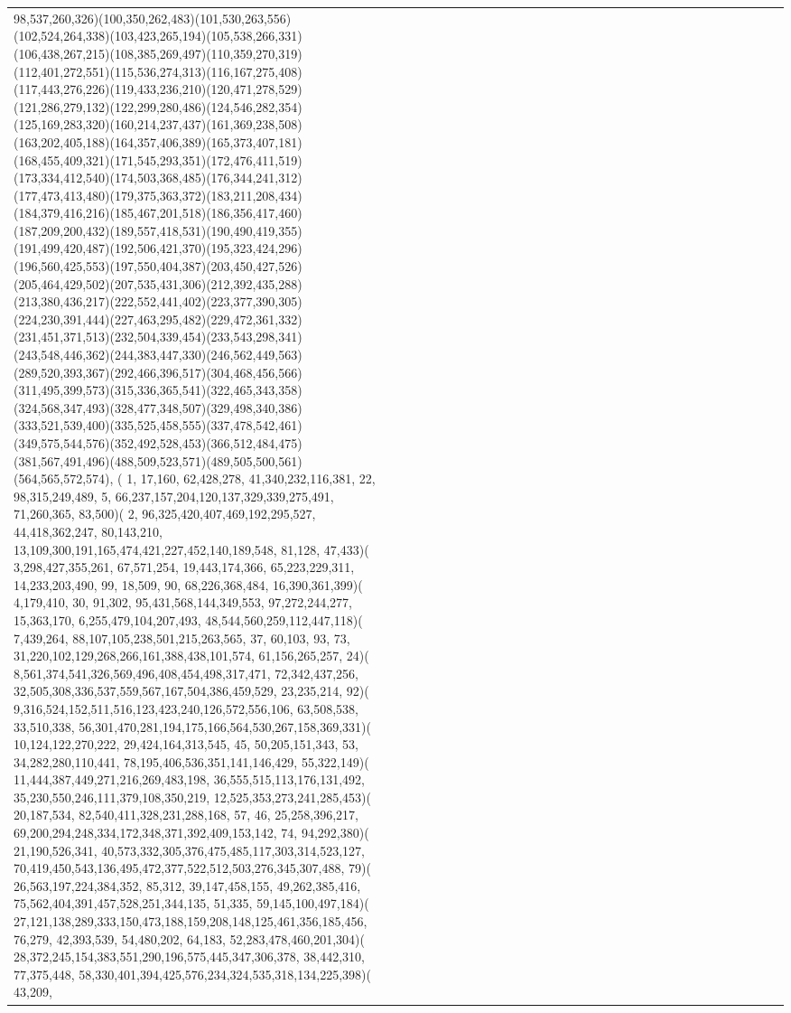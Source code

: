 \documentclass[varwidth=\maxdimen,border=10]{standalone}
\begin{document}
\begin{tabular}{@{}l@{}l@{}l@{}l@{}l@{}l@{}l@{}l@{}l@{}l@{}l@{}l@{}l@{}l@{}l@{}l@{}l@{}l@{}l@{}l@{}l@{}l@{}l@{}l@{}l@{}l@{}l@{}l@{}l@{}l@{}l@{}l@{}}
98,537,260,326)(100,350,262,483)(101,530,263,556)(102,524,264,338)(103,423,265,194)(105,538,266,331)(106,438,267,215)(108,385,269,497)(110,359,270,319)(112,401,272,551)(115,536,274,313)(116,167,275,408)(117,443,276,226)(119,433,236,210)(120,471,278,529)(121,286,279,132)(122,299,280,486)(124,546,282,354)(125,169,283,320)(160,214,237,437)(161,369,238,508)(163,202,405,188)(164,357,406,389)(165,373,407,181)(168,455,409,321)(171,545,293,351)(172,476,411,519)(173,334,412,540)(174,503,368,485)(176,344,241,312)(177,473,413,480)(179,375,363,372)(183,211,208,434)(184,379,416,216)(185,467,201,518)(186,356,417,460)(187,209,200,432)(189,557,418,531)(190,490,419,355)(191,499,420,487)(192,506,421,370)(195,323,424,296)(196,560,425,553)(197,550,404,387)(203,450,427,526)(205,464,429,502)(207,535,431,306)(212,392,435,288)(213,380,436,217)(222,552,441,402)(223,377,390,305)(224,230,391,444)(227,463,295,482)(229,472,361,332)(231,451,371,513)(232,504,339,454)(233,543,298,341)(243,548,446,362)(244,383,447,330)(246,562,449,563)(289,520,393,367)(292,466,396,517)(304,468,456,566)(311,495,399,573)(315,336,365,541)(322,465,343,358)(324,568,347,493)(328,477,348,507)(329,498,340,386)(333,521,539,400)(335,525,458,555)(337,478,542,461)(349,575,544,576)(352,492,528,453)(366,512,484,475)(381,567,491,496)(488,509,523,571)(489,505,500,561)(564,565,572,574), (  1, 17,160, 62,428,278, 41,340,232,116,381, 22, 98,315,249,489,  5, 66,237,157,204,120,137,329,339,275,491, 71,260,365, 83,500)(  2, 96,325,420,407,469,192,295,527, 44,418,362,247, 80,143,210, 13,109,300,191,165,474,421,227,452,140,189,548, 81,128, 47,433)(  3,298,427,355,261, 67,571,254, 19,443,174,366, 65,223,229,311, 14,233,203,490, 99, 18,509, 90, 68,226,368,484, 16,390,361,399)(  4,179,410, 30, 91,302, 95,431,568,144,349,553, 97,272,244,277, 15,363,170,  6,255,479,104,207,493, 48,544,560,259,112,447,118)(  7,439,264, 88,107,105,238,501,215,263,565, 37, 60,103, 93, 73, 31,220,102,129,268,266,161,388,438,101,574, 61,156,265,257, 24)(  8,561,374,541,326,569,496,408,454,498,317,471, 72,342,437,256, 32,505,308,336,537,559,567,167,504,386,459,529, 23,235,214, 92)(  9,316,524,152,511,516,123,423,240,126,572,556,106, 63,508,538, 33,510,338, 56,301,470,281,194,175,166,564,530,267,158,369,331)( 10,124,122,270,222, 29,424,164,313,545, 45, 50,205,151,343, 53, 34,282,280,110,441, 78,195,406,536,351,141,146,429, 55,322,149)( 11,444,387,449,271,216,269,483,198, 36,555,515,113,176,131,492, 35,230,550,246,111,379,108,350,219, 12,525,353,273,241,285,453)( 20,187,534, 82,540,411,328,231,288,168, 57, 46, 25,258,396,217, 69,200,294,248,334,172,348,371,392,409,153,142, 74, 94,292,380)( 21,190,526,341, 40,573,332,305,376,475,485,117,303,314,523,127, 70,419,450,543,136,495,472,377,522,512,503,276,345,307,488, 79)( 26,563,197,224,384,352, 85,312, 39,147,458,155, 49,262,385,416, 75,562,404,391,457,528,251,344,135, 51,335, 59,145,100,497,184)( 27,121,138,289,333,150,473,188,159,208,148,125,461,356,185,456, 76,279, 42,393,539, 54,480,202, 64,183, 52,283,478,460,201,304)( 28,372,245,154,383,551,290,196,575,445,347,306,378, 38,442,310, 77,375,448, 58,330,401,394,425,576,234,324,535,318,134,225,398)( 43,209, 
\end{tabular}
\end{document}
